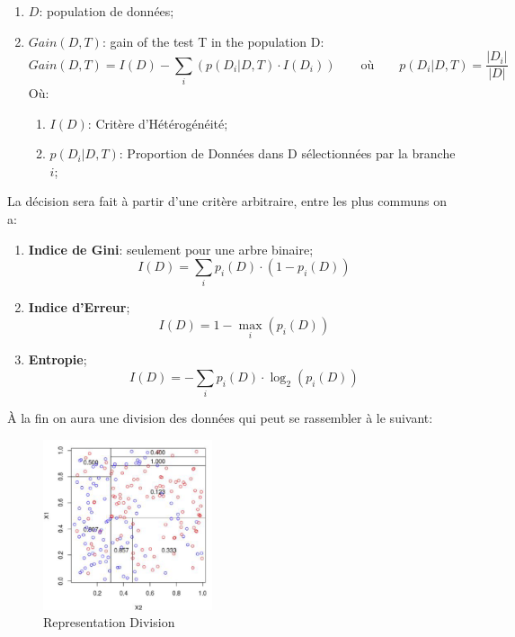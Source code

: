 \documentclass{article}
\begin{document}
\begin{enumerate}[noitemsep]
    \item $D$: population de données;
    \item $Gain(D, T)$: gain of the test T in the population D:
    \begin{equation}
        Gain(D, T) = I(D) - \sum_{i} (p(D_{i}|D, T) \cdot I(D_{i}))
        \qquad\text{où}\qquad
        p(D_{i}|D, T) = \frac{|D_{i}|}{|D|}
    \end{equation}
    Où:
    \begin{enumerate}[noitemsep]
        \item $I(D)$: Critère d'Hétérogénéité;
        \item $p(D_{i}|D, T)$: Proportion de Données dans D sélectionnées par la branche $i$;
    \end{enumerate}
\end{enumerate}
La décision sera fait à partir d'une critère arbitraire, entre les plus communs on a:
\begin{enumerate}[noitemsep]
    \item \textbf{Indice de Gini}: seulement pour une arbre binaire;
    \begin{equation}
        I(D) = \sum_{i} p_{i}(D)\cdot(1- p_{i}(D))
    \end{equation}
    \item \textbf{Indice d'Erreur};
    \begin{equation}
        I(D) = 1 - \max_{i} (p_{i}(D))
    \end{equation}
    \item \textbf{Entropie};
    \begin{equation}
        I(D) = -\sum_{i} p_{i}(D)\cdot\log_{2}(p_{i}(D))
    \end{equation}
\end{enumerate}
À la fin on aura une division des données qui peut se rassembler à le suivant:
\begin{figure}[H]
    \centering\includegraphics[height=50mm]{images/tree_diagram.png}
    \caption{Representation Division}
\end{figure}
\end{document}
